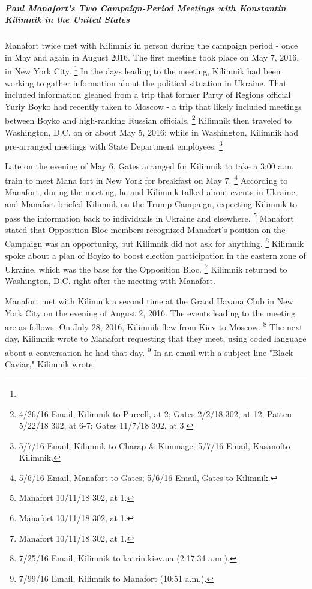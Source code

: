 \subparagraph{Paul Manafort's Two Campaign-Period Meetings with Konstantin Kilimnik in the United States}

Manafort twice met with Kilimnik in person during the campaign period - once in May and again in August 2016.
The first meeting took place on May 7, 2016, in New York City.%
\footnote{}
In the days leading to the meeting, Kilimnik had been working to gather information about the political situation in Ukraine.
That included information gleaned from a trip that former Party of Regions official Yuriy Boyko had recently taken to Moscow - a trip that likely included meetings between Boyko and high-ranking Russian officials.%
\footnote{4/26/16 Email, Kilimnik to Purcell, at 2;
Gates 2/2/18 302, at 12;
Patten 5/22/18 302, at 6-7;
Gates 11/7/18 302, at 3.}
Kilimnik then traveled to Washington, D.C. on or about May 5, 2016; while in Washington, Kilimnik had pre-arranged meetings with State Department employees.%
\footnote{5/7/16 Email, Kilimnik to Charap \& Kimmage;
5/7/16 Email, Kasanofto Kilimnik.}

Late on the evening of May 6, Gates arranged for Kilimnik to take a 3:00 a.m. train to meet Mana fort in New York for breakfast on May 7. %
\footnote{5/6/16 Email, Manafort to Gates;
5/6/16 Email, Gates to Kilimnik.}
According to Manafort, during the meeting, he and Kilimnik talked about events in Ukraine, and Manafort briefed Kilimnik on the Trump Campaign, expecting Kilimnik to pass the information back to individuals in Ukraine and elsewhere.%
\footnote{Manafort 10/11/18 302, at 1.}
Manafort stated that Opposition Bloc members recognized Manafort's position on the Campaign was an opportunity, but Kilimnik did not ask for anything.%
\footnote{Manafort 10/11/18 302, at 1.}
Kilimnik spoke about a plan of Boyko to boost election participation in the eastern zone of Ukraine, which was the base for the Opposition Bloc.%
\footnote{Manafort 10/11/18 302, at 1.}
Kilimnik returned to Washington, D.C. right after the meeting with Manafort.

Manafort met with Kilimnik a second time at the Grand Havana Club in New York City on the evening of August 2, 2016.
The events leading to the meeting are as follows.
On July 28, 2016, Kilimnik flew from Kiev to Moscow.%
\footnote{7/25/16 Email, Kilimnik to katrin\@yana.kiev.ua (2:17:34 a.m.).}
The next day, Kilimnik wrote to Manafort requesting that they meet, using coded language about a conversation he had that day.%
\footnote{7/99/16 Email, Kilimnik to Manafort (10:51 a.m.).}
In an email with a subject line "Black Caviar," Kilimnik wrote:

